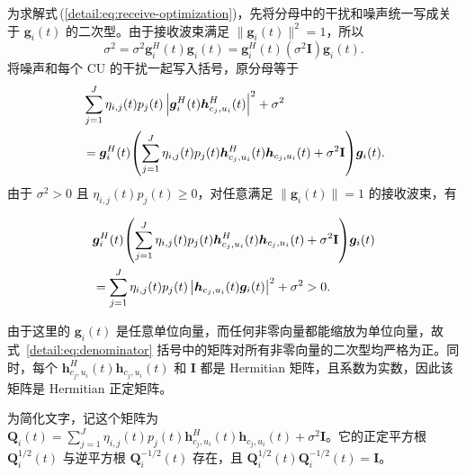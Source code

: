 \documentclass[11pt,a4paper]{ctexart}
\begin{document}
为求解式\,(\ref{detail:eq:receive-optimization})，先将分母中的干扰和噪声统一写成关于 $\bm g_i(t)$ 的二次型。由于接收波束满足 $\|\bm g_i(t)\|^2=1$，所以
\begin{equation}
\sigma^2=\sigma^2\bm g_i^H(t)\bm g_i(t)
=\bm g_i^H(t)(\sigma^2\mathbf I)\bm g_i(t).
\end{equation}
将噪声和每个 CU 的干扰一起写入括号，原分母等于
\begin{align}\label{detail:eq:denominator}
&\sum_{j=1}^J\eta_{i,j}(t)p_j(t)
\left|\bm g_i^H(t)\bm h_{c_j,u_i}^{H}(t)\right|^2+\sigma^2\notag\\
&=\bm g_i^H(t)\!\left(\sum_{j=1}^J\eta_{i,j}(t)p_j(t)
\bm h_{c_j,u_i}^{H}(t)\bm h_{c_j,u_i}(t)+\sigma^2\mathbf I\right)\!\bm g_i(t).
\end{align}
由于 $\sigma^2>0$ 且 $\eta_{i,j}(t)p_j(t)\ge0$，对任意满足 $\|\bm g_i(t)\|=1$ 的接收波束，有
\begin{samepage}
\begin{align}
&\bm g_i^H(t)\!\left(\sum_{j=1}^J\eta_{i,j}(t)p_j(t)
\bm h_{c_j,u_i}^{H}(t)\bm h_{c_j,u_i}(t)+\sigma^2\mathbf I\right)\!\bm g_i(t)\notag\\
&=\sum_{j=1}^J\eta_{i,j}(t)p_j(t)
\left|\bm h_{c_j,u_i}(t)\bm g_i(t)\right|^2+\sigma^2>0.
\end{align}
\end{samepage}
由于这里的 $\bm g_i(t)$ 是任意单位向量，而任何非零向量都能缩放为单位向量，故式~\eqref{detail:eq:denominator} 括号中的矩阵对所有非零向量的二次型均严格为正。同时，每个 $\bm h_{c_j,u_i}^{H}(t)\bm h_{c_j,u_i}(t)$ 和 $\mathbf I$ 都是 Hermitian 矩阵，且系数为实数，因此该矩阵是 Hermitian 正定矩阵。

为简化文字，记这个矩阵为 $\mathbf Q_i(t)=\sum_{j=1}^{J}\eta_{i,j}(t)p_j(t)\bm h_{c_j,u_i}^{H}(t)\bm h_{c_j,u_i}(t)+\sigma^2\mathbf I$。它的正定平方根 $\mathbf Q_i^{1/2}(t)$ 与逆平方根 $\mathbf Q_i^{-1/2}(t)$ 存在，且 $\mathbf Q_i^{1/2}(t)\mathbf Q_i^{-1/2}(t)=\mathbf I$。
\end{document}
